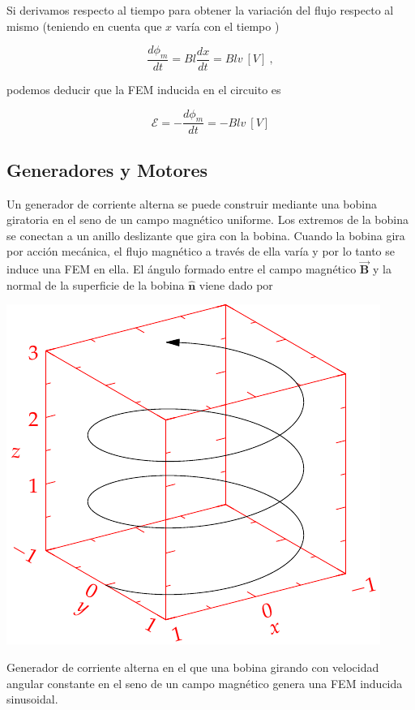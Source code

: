 \documentclass{tufte-handout}
\begin{document}
Si derivamos respecto al tiempo para obtener la variación del flujo respecto al mismo (teniendo en cuenta que $x$ varía con el tiempo )

\begin{equation}
\displaystyle\frac{d\phi_m}{dt} = Bl\displaystyle\frac{dx}{dt} = Blv~[V]~,
\end{equation}

podemos deducir que la FEM inducida en el circuito es

\begin{equation}
\mathcal{E} = -\displaystyle\frac{d\phi_m}{dt} = -Blv~[V]
\end{equation}

\subsection{Generadores y Motores}

Un generador de corriente alterna se puede construir mediante una bobina giratoria en el seno de un campo magnético uniforme. Los extremos de la bobina se conectan a un anillo deslizante que gira con la bobina. Cuando la bobina gira por acción mecánica, el flujo magnético a través de ella varía y por lo tanto se induce una FEM en ella. El ángulo formado entre el campo magnético $\mathbf{\vec{B}}$ y la normal de la superficie de la bobina $\mathbf{\hat{n}}$ viene dado por

\begin{marginfigure}%
    \includegraphics[width=\linewidth]{helix}
    \caption{Generador de corriente alterna en el que una bobina girando con velocidad angular constante en el seno de un campo magnético genera una FEM inducida sinusoidal.}
    \label{fig:generadorac}
\end{marginfigure}
\end{document}
